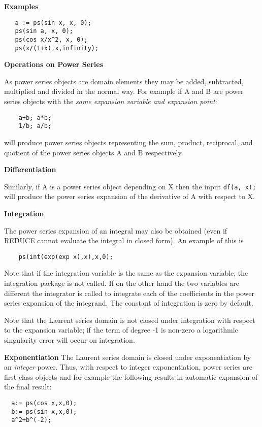 \textbf{Examples}
\begin{verbatim}
   a := ps(sin x, x, 0);
   ps(sin a, x, 0);
   ps(cos x/x^2, x, 0);
   ps(x/(1+x),x,infinity);
\end{verbatim}

\textbf{Operations on Power Series}

As power series objects are domain elements they may be added, subtracted,
multiplied and divided in the normal way. For example if A and B are power
series objects with the \emph{same expansion variable and expansion point}:
\begin{verbatim}
    a+b; a*b;
    1/b; a/b;
\end{verbatim}

will produce power series objects representing the sum, product, reciprocal,
and quotient of the power series objects A and B
respectively.

\textbf{Differentiation}

Similarly, if A is a power series object depending on X then the input
{\tt df(a, x);} will produce the power series expansion of the
derivative of A with respect to X.

\textbf{Integration}

The power series expansion of an integral may also be obtained (even if
REDUCE cannot evaluate the integral in closed form).  An example of
this is

\begin{verbatim}
    ps(int(exp(exp x),x),x,0);
\end{verbatim}

Note that if the integration variable is the same as the expansion
variable, the integration package is not called. If on the
other hand the two variables are different the integrator is
called to integrate each of the coefficients in the power series
expansion of the integrand.  The constant of integration is zero by
default.

Note that the Laurent series domain is not closed under integration with
respect to the expansion variable; if the term of degree -1 is non-zero a
logarithmic singularity error will occur on integration.

\textbf{Exponentiation}
The Laurent series domain is closed under exponentiation by an \emph{integer}
power. Thus, with respect to integer exponentiation, power series are first
class objects and for example the following results in automatic expansion of
the final result:
\begin{verbatim}
  a:= ps(cos x,x,0);
  b:= ps(sin x,x,0);
  a^2+b^(-2);
\end{verbatim}


